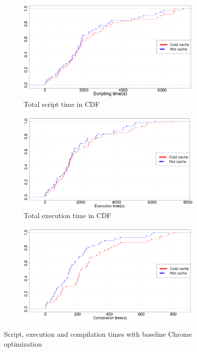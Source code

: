 \begin{figure}[!bth]
\begin{subfigure}[b]{0.33\textwidth}
\centering
  \includegraphics[width=\linewidth]{figs/chrome_script.png}
\caption{Total script time in CDF}
\label{fig:script_p2}
\end{subfigure}
\begin{subfigure}[b]{0.33\textwidth}
\centering
\includegraphics[width=\linewidth]{figs/chrome_exec.png}
\caption{Total execution time in CDF}
\label{fig:exec_p2}
\end{subfigure}
\begin{subfigure}[b]{0.33\textwidth}
\centering
\includegraphics[width=0.9\columnwidth]{figs/chrome_compile.png}
\label{fig:compile_p2}
\end{subfigure}
\caption{Script, execution and compilation times with baseline Chrome
  optimization}
\end{figure}

